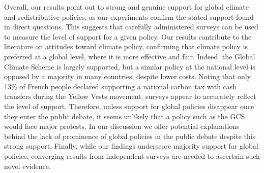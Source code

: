 Overall, our results %
point out to strong and genuine support for global climate and redistributive policies, as our experiments confirm the stated support found in direct questions. This suggests that carefully administered surveys can be used to measure the level of support for a given policy. Our results contribute to the literature on attitudes toward climate policy, confirming that climate policy is preferred at a global level,\citep{issp_international_2010,beiser-mcgrath_could_2019,sivonen_attitudes_2022,meilland_international_2023} where it is more effective and fair. Indeed, the Global Climate Scheme is largely supported, but a similar policy at the national level is opposed by a majority in many countries,\citep{dechezlepretre_fighting_2022} despite lower costs. Noting that only 13\% of French people declared supporting a national carbon tax with cash transfers during the Yellow Vests movement,\citep{douenne_yellow_2022} surveys appear to accurately reflect the level of support. Therefore, unless support for global policies disappear once they enter the public debate, it seems unlikely that a policy such as the GCS would face major protests. 
In our discussion we offer potential explanations behind the lack of prominence of global policies in the public debate despite this strong support. 
Finally, while our findings underscore majority support for global policies, converging results from independent surveys are needed to ascertain such novel evidence. %


